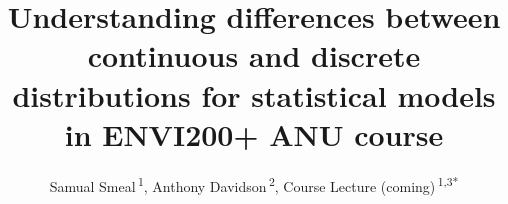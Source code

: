 \documentclass[utf8]{frontiersSCNS}
\def\Authors{
  Samual Smeal\,\textsuperscript{1},
  Anthony Davidson\,\textsuperscript{2},
  Course Lecture (coming)\,\textsuperscript{1,3*}}
\def\firstAuthorLast{Smeal {et~al.}}
\begin{document}
\onecolumn
{}

\title[Understanding Simpsons Paradox]{Understanding differences between continuous and discrete distributions
for statistical models in ENVI200+ ANU course}
\author[\firstAuthorLast]{\Authors}
\address{} %
\correspondance{} %

\extraAuth{}%


\maketitle
\end{document}
